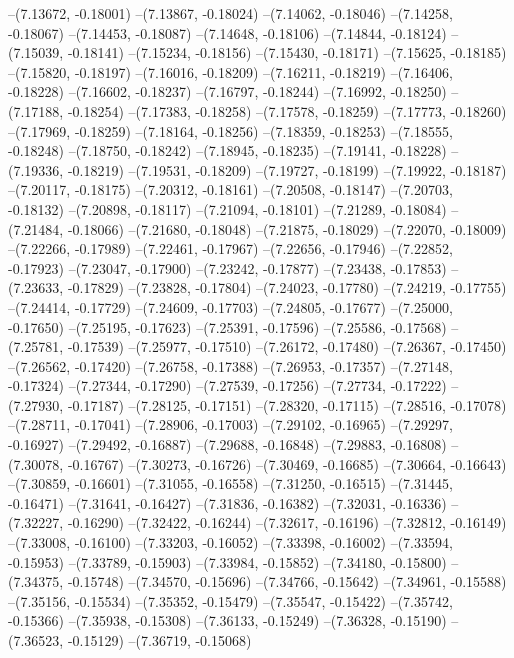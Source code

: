 --(7.13672, -0.18001)
--(7.13867, -0.18024)
--(7.14062, -0.18046)
--(7.14258, -0.18067)
--(7.14453, -0.18087)
--(7.14648, -0.18106)
--(7.14844, -0.18124)
--(7.15039, -0.18141)
--(7.15234, -0.18156)
--(7.15430, -0.18171)
--(7.15625, -0.18185)
--(7.15820, -0.18197)
--(7.16016, -0.18209)
--(7.16211, -0.18219)
--(7.16406, -0.18228)
--(7.16602, -0.18237)
--(7.16797, -0.18244)
--(7.16992, -0.18250)
--(7.17188, -0.18254)
--(7.17383, -0.18258)
--(7.17578, -0.18259)
--(7.17773, -0.18260)
--(7.17969, -0.18259)
--(7.18164, -0.18256)
--(7.18359, -0.18253)
--(7.18555, -0.18248)
--(7.18750, -0.18242)
--(7.18945, -0.18235)
--(7.19141, -0.18228)
--(7.19336, -0.18219)
--(7.19531, -0.18209)
--(7.19727, -0.18199)
--(7.19922, -0.18187)
--(7.20117, -0.18175)
--(7.20312, -0.18161)
--(7.20508, -0.18147)
--(7.20703, -0.18132)
--(7.20898, -0.18117)
--(7.21094, -0.18101)
--(7.21289, -0.18084)
--(7.21484, -0.18066)
--(7.21680, -0.18048)
--(7.21875, -0.18029)
--(7.22070, -0.18009)
--(7.22266, -0.17989)
--(7.22461, -0.17967)
--(7.22656, -0.17946)
--(7.22852, -0.17923)
--(7.23047, -0.17900)
--(7.23242, -0.17877)
--(7.23438, -0.17853)
--(7.23633, -0.17829)
--(7.23828, -0.17804)
--(7.24023, -0.17780)
--(7.24219, -0.17755)
--(7.24414, -0.17729)
--(7.24609, -0.17703)
--(7.24805, -0.17677)
--(7.25000, -0.17650)
--(7.25195, -0.17623)
--(7.25391, -0.17596)
--(7.25586, -0.17568)
--(7.25781, -0.17539)
--(7.25977, -0.17510)
--(7.26172, -0.17480)
--(7.26367, -0.17450)
--(7.26562, -0.17420)
--(7.26758, -0.17388)
--(7.26953, -0.17357)
--(7.27148, -0.17324)
--(7.27344, -0.17290)
--(7.27539, -0.17256)
--(7.27734, -0.17222)
--(7.27930, -0.17187)
--(7.28125, -0.17151)
--(7.28320, -0.17115)
--(7.28516, -0.17078)
--(7.28711, -0.17041)
--(7.28906, -0.17003)
--(7.29102, -0.16965)
--(7.29297, -0.16927)
--(7.29492, -0.16887)
--(7.29688, -0.16848)
--(7.29883, -0.16808)
--(7.30078, -0.16767)
--(7.30273, -0.16726)
--(7.30469, -0.16685)
--(7.30664, -0.16643)
--(7.30859, -0.16601)
--(7.31055, -0.16558)
--(7.31250, -0.16515)
--(7.31445, -0.16471)
--(7.31641, -0.16427)
--(7.31836, -0.16382)
--(7.32031, -0.16336)
--(7.32227, -0.16290)
--(7.32422, -0.16244)
--(7.32617, -0.16196)
--(7.32812, -0.16149)
--(7.33008, -0.16100)
--(7.33203, -0.16052)
--(7.33398, -0.16002)
--(7.33594, -0.15953)
--(7.33789, -0.15903)
--(7.33984, -0.15852)
--(7.34180, -0.15800)
--(7.34375, -0.15748)
--(7.34570, -0.15696)
--(7.34766, -0.15642)
--(7.34961, -0.15588)
--(7.35156, -0.15534)
--(7.35352, -0.15479)
--(7.35547, -0.15422)
--(7.35742, -0.15366)
--(7.35938, -0.15308)
--(7.36133, -0.15249)
--(7.36328, -0.15190)
--(7.36523, -0.15129)
--(7.36719, -0.15068)
